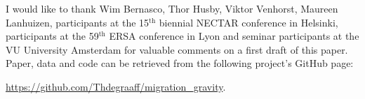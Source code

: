 \documentclass[fleqn,10pt]{SelfArx} %
\begin{document}
I would like to thank Wim Bernasco, Thor Husby, Viktor Venhorst, Maureen
Lanhuizen, participants at the 15$^{\text{th}}$ biennial NECTAR conference in
Helsinki, participants at the 59$^{\text{th}}$ ERSA conference in Lyon and
seminar participants at the VU University Amsterdam for valuable comments on a
first draft of this paper. Paper, data and code can be retrieved from the
following project's GitHub page:

\href{https://github.com/Thdegraaff/migration_gravity}{https://github.com/Thdegraaff/migration\_gravity}.


\printbibliography

\end{document}
